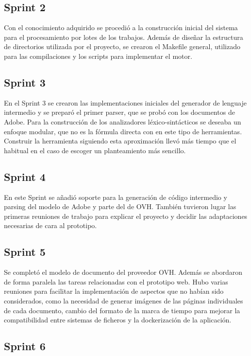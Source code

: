\subsection{Sprint 2}

Con el conocimiento adquirido se procedió a la construcción inicial del sistema para el procesamiento por lotes de los trabajos. Además de diseñar la estructura de directorios utilizada por el proyecto, se crearon el Makefile general, utilizado para las compilaciones y los scripts para implementar el motor.

\subsection{Sprint 3}

En el Sprint 3 se crearon las implementaciones iniciales del generador de lenguaje intermedio y se preparó el primer parser, que se probó con los documentos de Adobe. Para la construcción de los analizadores léxico-sintácticos se deseaba un enfoque modular, que no es la fórmula directa con en este tipo de herramientas. Construir la herramienta siguiendo esta aproximación llevó más tiempo que el habitual en el caso de escoger un planteamiento más sencillo.

\subsection{Sprint 4}

En este Sprint se añadió soporte para la generación de código intermedio y parsing del modelo de Adobe y parte del de OVH. También tuvieron lugar las primeras reuniones de trabajo para explicar el proyecto y decidir las adaptaciones necesarias de cara al prototipo.

\subsection{Sprint 5}

Se completó el modelo de documento del proveedor OVH. Además se abordaron de forma paralela las tareas relacionadas con el prototipo web. Hubo varias reuniones para facilitar la implementación de aspectos que no habían sido considerados, como  la necesidad de generar imágenes de las páginas individuales de cada documento, cambio del formato de la marca de tiempo para mejorar la compatibilidad entre sistemas de ficheros y la dockerización de la aplicación.

\subsection{Sprint 6}

